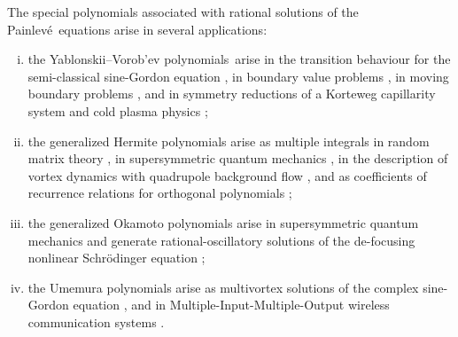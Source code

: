 \documentclass[10pt]{amsart}
\theoremstyle{definition}
\numberwithin{equation}{section}
\numberwithin{figure}{section}
\newcommand{\p}{Painlev\'{e}}
\newcommand{\VY}{Yablonskii--Vorob'ev polynomials}
\begin{document}
The special polynomials associated with rational solutions of the \p\ equations arise in several applications:
\begin{enumerate}[(i)]
\item the \VY\ arise in the transition behaviour for the semi-classical sine-Gordon equation \cite{refBM12},
in boundary value problems \cite{refBNRS},
in moving boundary problems \cite{refRogers15,refRogers16,refRogers17},
and in symmetry reductions of a Korteweg capillarity system \cite{refRC17} and cold plasma physics \cite{refRC18};
\item the generalized Hermite polynomials arise as multiple integrals in random matrix theory \cite{refFW01},
in supersymmetric quantum mechanics \cite{bermudez2012complex,bermudez2012complexb,marquette2016,Novokshenov18},
in the description of vortex dynamics with quadrupole background flow \cite{Clarkson2009vortices},
and as coefficients of recurrence relations for orthogonal polynomials \cite{chen2006painleve,clarkson2014relationship,refWVAbook};
\item the generalized Okamoto polynomials arise in supersymmetric quantum mechanics \cite{marquette2016} and 
generate rational-oscillatory solutions of the de-focusing nonlinear Schr{\"o}dinger equation \cite{clarkson2006special};
\item the Umemura polynomials arise as multivortex solutions of the complex sine-Gordon equation \cite{refBP98,refOB05}, and in 
Multiple-Input-Multiple-Output wireless communication systems \cite{refCCBC}.
\end{enumerate}
%
\end{document}

